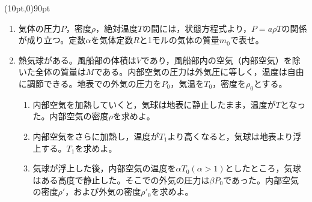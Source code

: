 \hakosyokika
\item
    \begin{mawarikomi}(10pt,0){90pt}{}
        \begin{enumerate}
            \item 気体の圧力$P$，密度$\rho$，絶対温度$T$の間には，状態方程式より，$P=a \rho T$の関係が成り立つ。定数$\alpha $を気体定数$R$と1モルの気体の質量$m_0$で表せ。
            \item 熱気球がある。風船部の体積は$V$であり，風船部内の空気（内部空気）を除いた全体の質量は$M$である。内部空気の圧力は外気圧に等しく，温度は自由に調節できる。地表での外気の圧力を$P_0$，気温を$T_0$，密度を$\rho _0$とする。
            \begin{enumerate}
                \item 内部空気を加熱していくと，気球は地表に静止したまま，温度が$T$となった。内部空気の密度$\rho $を求めよ。
                \item 内部空気をさらに加熱し，温度が$T_1$より高くなると，気球は地表より浮上する。$T_1$を求めよ。
                \item 気球が浮上した後，内部空気の温度を$\alpha T_0$$(\alpha >1)$としたところ，気球はある高度で静止した。そこでの外気の圧力は$\beta P_0$であった。内部空気の密度$\rho '$，および外気の密度$\rho '_0$を求めよ。
            \end{enumerate}
        \end{enumerate}
    \end{mawarikomi}